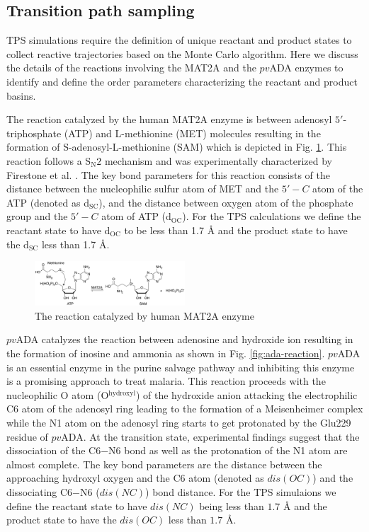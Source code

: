 \documentclass[journal=jpcbfk,manuscript=article,layout=traditional]{achemso}
\begin{document}
\subsection{Transition path sampling}
TPS simulations require the definition of unique reactant and product states
to collect reactive trajectories based on the Monte Carlo algorithm. Here we 
discuss the details of the reactions involving the MAT2A and the $pv$ADA enzymes 
to identify and define the order parameters characterizing the reactant and product basins.  

The reaction catalyzed by the human MAT2A enzyme is
between adenosyl $5'$-triphosphate (ATP) and L-methionine (MET) molecules 
resulting in the formation of S-adenosyl-L-methionine (SAM) which is 
depicted in Fig. \ref{fig:mat2a-reaction}. This reaction follows a S$_{\text{N}}2$ 
mechanism and was experimentally characterized by 
Firestone et al. \cite{Firestone17JAmChemSoc139p13754}. The key bond 
parameters for this reaction consists of the distance between the
nucleophilic sulfur atom of MET and the $5'-C$ atom of the ATP (denoted as d$_{\mathrm{SC}}$), 
and the distance between oxygen atom of the phosphate group and the $5'-C$ 
atom of ATP (d$_{\mathrm{OC}}$). For the TPS calculations we define the 
reactant state to have d$_{\mathrm{OC}}$ to be less than 1.7 {\AA} and the product 
state to have the d$_{\mathrm{SC}}$ less than 1.7 {\AA}. 

\begin{figure}
\includegraphics[width=0.5\textwidth]{figures/mat2a-reaction.png}
\caption{The reaction catalyzed by human MAT2A enzyme}
\label{fig:mat2a-reaction}
\end{figure}

$pv$ADA catalyzes the reaction between adenosine and hydroxide ion 
resulting in the formation of inosine and ammonia as shown in
Fig. \ref{fig:ada-reaction}.
$pv$ADA is an essential enzyme in the purine salvage pathway and 
inhibiting this enzyme is a promising approach to treat malaria.   
This reaction proceeds with the nucleophilic O atom (O$^{\text{hydroxyl}}$) of the hydroxide anion
attacking the electrophilic C6 atom of the adenosyl ring leading to the formation of a Meisenheimer 
complex while the N1 atom on the adenosyl ring starts to get 
protonated by the Glu229 residue of $pv$ADA. At the transition state, experimental findings 
suggest that the dissociation of the C6$-$N6 bond as well as the protonation of the N1 
atom are almost complete. \cite{Luo07JAmChemSoc129p8008} The key bond parameters are 
the distance between the approaching hydroxyl oxygen and the C6 atom (denoted as $dis(OC)$) and the 
dissociating C6$-$N6 ($dis(NC)$) bond distance. For the TPS simulaions we define the reactant state to 
have $dis(NC)$ being less than $1.7$ {\AA} and the product state to have the 
$dis(OC)$ less than $1.7$ {\AA}.
\end{document}

